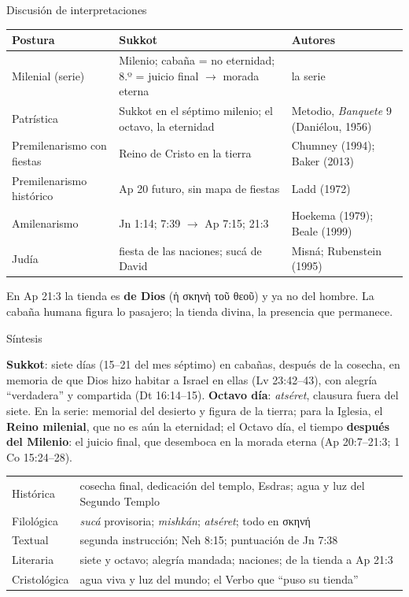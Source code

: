 \documentclass[hyperref={bookmarks=false},aspectratio=169]{beamer}
\newcommand{\grc}[1]{\foreignlanguage{ancientgreek}{#1}}
\newcommand{\destacar}[1]{\textbf{\textcolor{tierraroja}{#1}}}
\begin{document}
\begin{frame}{Discusión de interpretaciones}
\scriptsize\renewcommand{\arraystretch}{1.12}
\begin{tabular}{@{}L{2.5cm}L{5.0cm}L{4.2cm}@{}}
\toprule
\textbf{Postura} & \textbf{Sukkot} & \textbf{Autores} \\ \midrule
Milenial (serie) & Milenio; cabaña = no eternidad; 8.º = juicio final $\rightarrow$ morada eterna & la serie \\
Patrística & Sukkot en el séptimo milenio; el octavo, la eternidad & Metodio, \emph{Banquete} 9 (Daniélou, 1956) \\
Premilenarismo con fiestas & Reino de Cristo en la tierra & Chumney (1994); Baker (2013) \\
Premilenarismo histórico & Ap 20 futuro, sin mapa de fiestas & Ladd (1972) \\
Amilenarismo & Jn 1:14; 7:39 $\rightarrow$ Ap 7:15; 21:3 & Hoekema (1979); Beale (1999) \\
Judía & fiesta de las naciones; sucá de David & Misná; Rubenstein (1995) \\
\bottomrule
\end{tabular}\par\medskip
\small En Ap 21:3 la tienda es \destacar{de Dios} (\grc{ἡ σκηνὴ τοῦ θεοῦ}) y ya no del hombre. La cabaña humana figura lo pasajero; la tienda divina, la presencia que permanece.
\end{frame}

\begin{frame}{Síntesis}
\begin{tcolorbox}[colback=papiro,colframe=tierraroja,boxrule=1pt,arc=3pt,left=5pt,right=5pt]
\scriptsize \textbf{Sukkot}: siete días (15--21 del mes séptimo) en cabañas, después de la cosecha, en memoria de que Dios hizo habitar a Israel en ellas (Lv 23:42--43), con alegría ``verdadera'' y compartida (Dt 16:14--15). \textbf{Octavo día}: \emph{atséret}, clausura fuera del siete. En la serie: memorial del desierto y figura de la tierra; para la Iglesia, el \destacar{Reino milenial}, que no es aún la eternidad; el Octavo día, el tiempo \destacar{después del Milenio}: el juicio final, que desemboca en la morada eterna (Ap 20:7--21:3; 1 Co 15:24--28).
\end{tcolorbox}
\scriptsize\renewcommand{\arraystretch}{1.08}
\begin{tabular}{@{}L{2.0cm}L{9.8cm}@{}}
\toprule
Histórica & cosecha final, dedicación del templo, Esdras; agua y luz del Segundo Templo \\
Filológica & \emph{sucá} provisoria; \emph{mishkán}; \emph{atséret}; todo en \grc{σκηνή} \\
Textual & segunda instrucción; Neh 8:15; puntuación de Jn 7:38 \\
Literaria & siete y octavo; alegría mandada; naciones; de la tienda a Ap 21:3 \\
Cristológica & agua viva y luz del mundo; el Verbo que ``puso su tienda'' \\
\bottomrule
\end{tabular}
\end{frame}
\end{document}
